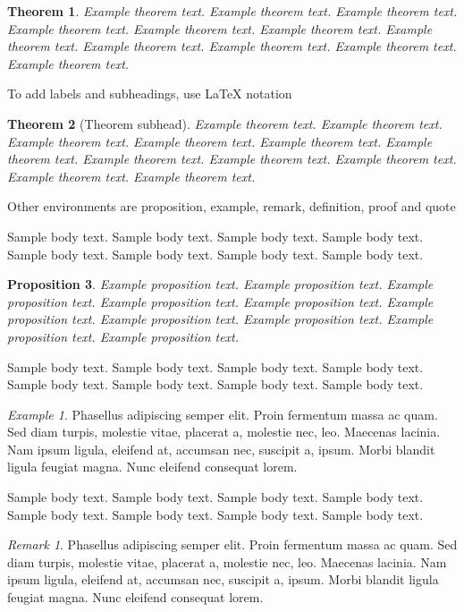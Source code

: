 \documentclass[sn-basic,pdflatex]{sn-jnl}
\newtheorem{theorem}{Theorem}%
\newtheorem{proposition}[theorem]{Proposition}%
\theoremstyle{remark}
\newtheorem{example}{Example}%
\newtheorem{remark}{Remark}%
\theoremstyle{definition}
\begin{document}
\begin{theorem}
Example theorem text. Example theorem text. Example theorem text.
Example theorem text. Example theorem text. Example theorem text.
Example theorem text. Example theorem text. Example theorem text.
Example theorem text. Example theorem text.

\end{theorem}

To add labels and subheadings, use LaTeX notation

\begin{theorem}[Theorem subhead]\label{thm1}
Example theorem text. Example theorem text. Example theorem text.
Example theorem text. Example theorem text. Example theorem text.
Example theorem text. Example theorem text. Example theorem text.
Example theorem text. Example theorem text.

\end{theorem}

Other environments are proposition, example, remark, definition, proof
and quote

Sample body text. Sample body text. Sample body text. Sample body text.
Sample body text. Sample body text. Sample body text. Sample body text.

\begin{proposition}
Example proposition text. Example proposition text. Example proposition
text. Example proposition text. Example proposition text. Example
proposition text. Example proposition text. Example proposition text.
Example proposition text. Example proposition text.

\end{proposition}

Sample body text. Sample body text. Sample body text. Sample body text.
Sample body text. Sample body text. Sample body text. Sample body text.

\begin{example}
Phasellus adipiscing semper elit. Proin fermentum massa ac quam. Sed
diam turpis, molestie vitae, placerat a, molestie nec, leo. Maecenas
lacinia. Nam ipsum ligula, eleifend at, accumsan nec, suscipit a, ipsum.
Morbi blandit ligula feugiat magna. Nunc eleifend consequat lorem.

\end{example}

Sample body text. Sample body text. Sample body text. Sample body text.
Sample body text. Sample body text. Sample body text. Sample body text.

\begin{remark}
Phasellus adipiscing semper elit. Proin fermentum massa ac quam. Sed
diam turpis, molestie vitae, placerat a, molestie nec, leo. Maecenas
lacinia. Nam ipsum ligula, eleifend at, accumsan nec, suscipit a, ipsum.
Morbi blandit ligula feugiat magna. Nunc eleifend consequat lorem.

\end{remark}
\end{document}
